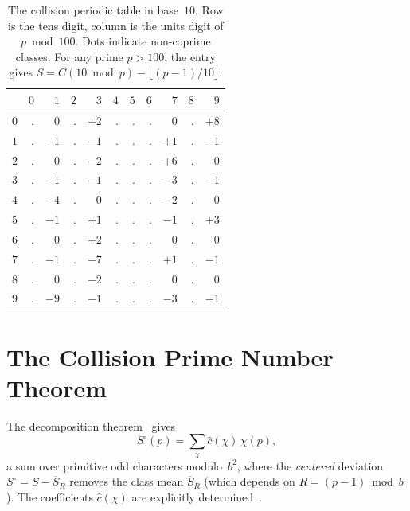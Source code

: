 \documentclass[12pt]{amsart}
\theoremstyle{definition}
\theoremstyle{remark}
\begin{document}
\begin{table}[ht]
\centering
\begin{tabular}{r*{10}{r}}
\toprule
& $0$ & $1$ & $2$ & $3$ & $4$ & $5$ & $6$ & $7$ & $8$ & $9$ \\
\midrule
$0$ & $.$ & $0$  & $.$ & $+2$ & $.$ & $.$ & $.$ & $0$  & $.$ & $+8$ \\
$1$ & $.$ & $-1$ & $.$ & $-1$ & $.$ & $.$ & $.$ & $+1$ & $.$ & $-1$ \\
$2$ & $.$ & $0$  & $.$ & $-2$ & $.$ & $.$ & $.$ & $+6$ & $.$ & $0$ \\
$3$ & $.$ & $-1$ & $.$ & $-1$ & $.$ & $.$ & $.$ & $-3$ & $.$ & $-1$ \\
$4$ & $.$ & $-4$ & $.$ & $0$  & $.$ & $.$ & $.$ & $-2$ & $.$ & $0$ \\
$5$ & $.$ & $-1$ & $.$ & $+1$ & $.$ & $.$ & $.$ & $-1$ & $.$ & $+3$ \\
$6$ & $.$ & $0$  & $.$ & $+2$ & $.$ & $.$ & $.$ & $0$  & $.$ & $0$ \\
$7$ & $.$ & $-1$ & $.$ & $-7$ & $.$ & $.$ & $.$ & $+1$ & $.$ & $-1$ \\
$8$ & $.$ & $0$  & $.$ & $-2$ & $.$ & $.$ & $.$ & $0$  & $.$ & $0$ \\
$9$ & $.$ & $-9$ & $.$ & $-1$ & $.$ & $.$ & $.$ & $-3$ & $.$ & $-1$ \\
\bottomrule
\end{tabular}
\caption{The collision periodic table in base~$10$.
Row is the tens digit, column is the units digit of
$p \bmod 100$. Dots indicate non-coprime classes. For
any prime $p > 100$, the entry gives
$S = C(10 \bmod p) - \lfloor(p{-}1)/10\rfloor$.}
\label{tab:periodic}
\end{table}

\section{The Collision Prime Number Theorem}

The decomposition theorem~\cite{paperB} gives
\begin{equation}\label{eq:decomp}
S^{\circ}(p) = \sum_{\chi} \widehat{c}(\chi)\, \chi(p),
\end{equation}
a sum over primitive odd characters modulo~$b^2$, where the
\emph{centered} deviation $S^{\circ} = S - \overline{S}_R$
removes the class mean $\overline{S}_R$ (which depends on
$R = (p{-}1) \bmod b$). The coefficients $\widehat{c}(\chi)$
are explicitly determined~\cite{paperC}.
\end{document}
